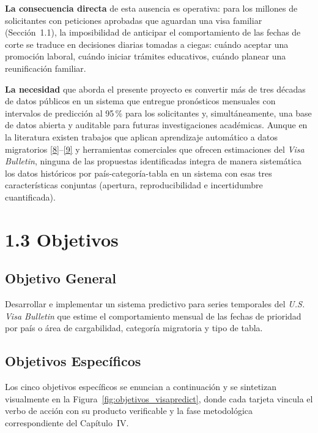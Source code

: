 \documentclass[12pt,letterpaper]{report}
\newcommand{\cita}[1]{\hyperref[bib:#1]{[#1]}}
\begin{document}
\textbf{La consecuencia directa} de esta ausencia es operativa: para los millones de solicitantes con peticiones aprobadas que aguardan una visa familiar (Sección~1.1), la imposibilidad de anticipar el comportamiento de las fechas de corte se traduce en decisiones diarias tomadas a ciegas: cuándo aceptar una promoción laboral, cuándo iniciar trámites educativos, cuándo planear una reunificación familiar.

\textbf{La necesidad} que aborda el presente proyecto es convertir más de tres décadas de datos públicos en un sistema que entregue pronósticos mensuales con intervalos de predicción al 95\,\% para los solicitantes y, simultáneamente, una base de datos abierta y auditable para futuras investigaciones académicas. Aunque en la literatura existen trabajos que aplican aprendizaje automático a datos migratorios \cita{8}--\cita{9} y herramientas comerciales que ofrecen estimaciones del \textit{Visa Bulletin}, ninguna de las propuestas identificadas integra de manera sistemática los datos históricos por país-categoría-tabla en un sistema con esas tres características conjuntas (apertura, reproducibilidad e incertidumbre cuantificada).

\section{1.3 Objetivos}

\subsection*{Objetivo General}

Desarrollar e implementar un sistema predictivo para series temporales del \textit{U.S. Visa Bulletin} que estime el comportamiento mensual de las fechas de prioridad por país o área de cargabilidad, categoría migratoria y tipo de tabla.

\subsection*{Objetivos Específicos}

Los cinco objetivos específicos se enuncian a continuación y se sintetizan visualmente en la Figura~\ref{fig:objetivos_visapredict}, donde cada tarjeta vincula el verbo de acción con su producto verificable y la fase metodológica correspondiente del Capítulo~IV.
\end{document}
